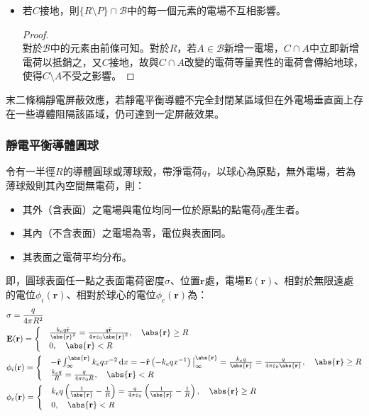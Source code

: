\documentclass[a4paper,12pt]{report}
\begin{document}
\begin{itemize}
\begin{itemize}
\begin{proof}
\[\varepsilon\oint_S\mb{E}\cdot\mathrm{d}\mb{S}=0\]
又$B\setminus D=A$，故得證。
\end{proof}
\item 若$C$接地，則$\{R\setminus P\}\cap\mathscr{B}$中的每一個元素的電場不互相影響。
\begin{proof}\mbox{}\\
對於$\mathscr{B}$中的元素由前條可知。對於$R$，若$A\in\mathscr{B}$新增一電場，$C\cap A$中立即新增電荷以抵銷之，又$C$接地，故與$C\cap A$改變的電荷等量異性的電荷會傳給地球，使得$C\setminus A$不受之影響。
\end{proof}
\end{itemize}
末二條稱靜電屏蔽效應，若靜電平衡導體不完全封閉某區域但在外電場垂直面上存在一些導體阻隔該區域，仍可達到一定屏蔽效果。
\subsubsection{靜電平衡導體圓球}
令有一半徑$R$的導體圓球或薄球殼，帶淨電荷$q$，以球心為原點，無外電場，若為薄球殼則其內空間無電荷，則：
\begin{itemize}
\item 其外（含表面）之電場與電位均同一位於原點的點電荷$q$產生者。
\item 其內（不含表面）之電場為零，電位與表面同。
\item 其表面之電荷平均分布。
\end{itemize}
即，圓球表面任一點之表面電荷密度$\sigma$、位置$\mathbf{r}$處，電場$\mathbf{E}(\mathbf{r})$、相對於無限遠處的電位$\phi_i(\mathbf{r})$、相對於球心的電位$\phi_c(\mathbf{r})$為：
\[\begin{aligned}
& \sigma=\frac{q}{4\pi R^2}\\
& \mathbf{E}(\mathbf{r})=
\begin{cases}
& \frac{k_eq\hat{\mathbf{r}}}{\abs{\mathbf{r}}^2}=\frac{q\hat{\mathbf{r}}}{4\pi\varepsilon_0\abs{\mathbf{r}}^2},\quad\abs{\mathbf{r}}\geq R\\
& 0,\quad\abs{\mathbf{r}}<R
\end{cases}\\
& \phi_i(\mathbf{r}) = 
\begin{cases}
& -\hat{\mathbf{r}}\int_\infty^{\abs{\mathbf{r}}}k_eqx^{-2}\,\mathrm{d}x=-\hat{\mathbf{r}}\left(-k_eqx^{-1}\right)\big\vert_\infty^{\abs{\mathbf{r}}}=\frac{k_eq}{\abs{\mathbf{r}}}=\frac{q}{4\pi\varepsilon_0\abs{\mathbf{r}}},\quad\abs{\mathbf{r}}\geq R\\
& \frac{k_eq}{R}=\frac{q}{4\pi\varepsilon_0 R},\quad\abs{\mathbf{r}}<R
\end{cases}\\
& \phi_c(\mathbf{r}) = 
\begin{cases}
& k_eq\left(\frac{1}{\abs{\mathbf{r}}}-\frac{1}{R}\right)=\frac{q}{4\pi\varepsilon_0}\left(\frac{1}{\abs{\mathbf{r}}}-\frac{1}{R}\right),\quad\abs{\mathbf{r}}\geq R\\
& 0,\quad\abs{\mathbf{r}}<R
\end{cases}
\end{aligned}\]

\end{itemize}
\end{document}
